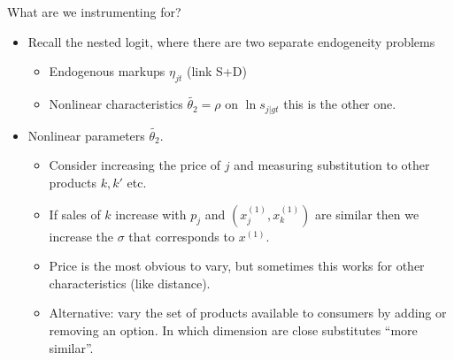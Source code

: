 
\begin{frame}{What are we instrumenting for?}
\begin{itemize}
\item Recall the nested logit, where there are two separate endogeneity problems
\begin{itemize}
\item Endogenous \alert{markups} $\eta_{jt}$ (link S+D)
\item \alert{Nonlinear characteristics} $\widetilde{\theta_2}=\rho$ on $\ln s_{j|gt}$ this is the other one.
\end{itemize}
\item Nonlinear parameters $\widetilde{\theta_2}$.
\begin{itemize}
\item Consider increasing the price of $j$ and measuring substitution to other products $k,k'$ etc.
\item If sales of $k$ increase with $p_j$ and $(x_j^{(1)},x_k^{(1)})$ are similar then we increase the $\sigma$ that corresponds to $x^{(1)}$.
\item Price is the most obvious to vary, but sometimes this works for other characteristics (like distance).
\item Alternative: vary the set of products available to consumers by adding or removing an option. In which dimension are close substitutes ``more similar''.
\end{itemize}
\end{itemize}
\end{frame}






